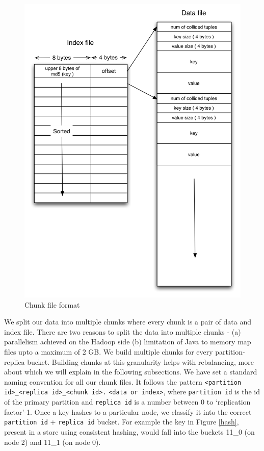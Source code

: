 \documentclass[10pt,twocolumn,preprint,natbib,authoryear]{sigplanconf}
\begin{document}
\begin{figure}
  \centering
    \includegraphics[scale=0.45]{storage_format.png}
  \caption{Chunk file format}
  \label{storage_format}
\end{figure}


We split our data into multiple chunks where every chunk is a pair of data and index file. There are two reasons to split the data into multiple chunks - (a) parallelism achieved on the Hadoop side (b) limitation of Java to memory map files upto a maximum of 2 GB. We build multiple chunks for every partition-replica bucket. Building chunks at this granularity helps with rebalancing, more about which we will explain in the following subsections. We have set a standard naming convention for all our chunk files. It follows the pattern \verb=<partition id>_<replica id>_<chunk id>.= \verb=<data or index>=, where \verb=partition id= is the id of the primary partition and \verb=replica id= is a number between 0 to `replication factor'-1. Once a key hashes to a particular node, we classify it into the correct \verb=partition id= + \verb=replica id= bucket. For example the key in Figure \ref{hash}, present in a store using consistent hashing, would fall into the buckets 11\_0 (on node 2) and 11\_1 (on node 0). 
\end{document}
